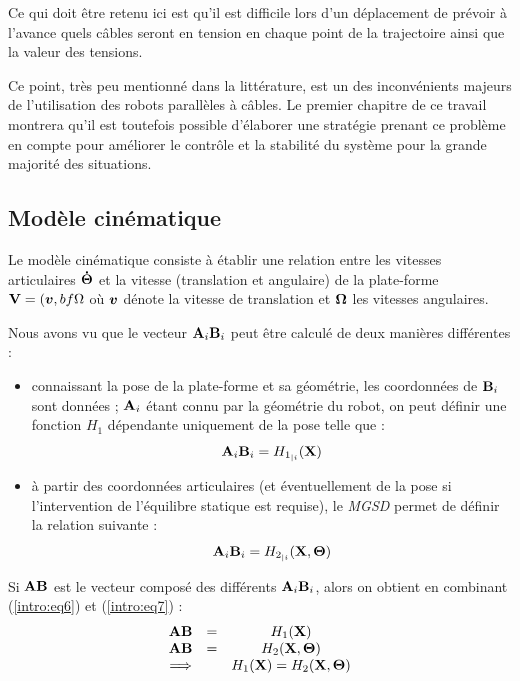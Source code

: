 Ce qui doit \^etre retenu ici est qu'il est difficile lors d'un déplacement de 
prévoir à l'avance quels câbles seront en tension en chaque point de la 
trajectoire ainsi que la valeur des tensions.

Ce point, très peu mentionné dans la littérature, est un des inconvénients 
majeurs de l'utilisation des robots parallèles à câbles. Le premier chapitre de 
ce travail montrera qu'il est toutefois possible d'élaborer une stratégie 
prenant ce problème en compte pour améliorer le contrôle et la stabilité du 
système pour la grande majorité des situations.

\subsection{Modèle cinématique}\label{chap0-2-5}

Le modèle cinématique consiste à établir une relation entre les 
vitesses articulaires ${\bf \dot \Theta}$ et la vitesse (translation et 
angulaire) de la plate-forme ${\bf V} = (\hbox{\boldmath $v$}, {bf \Omega}$ o\`u $\hbox{\boldmath $v$}$ d\'enote 
la vitesse de translation et $\bf \Omega$ les vitesses angulaires.

Nous avons vu que le vecteur ${\bf A}_i{\bf B}_i$ peut être calculé de deux 
manières différentes :
\begin{itemize}
 \item connaissant la pose de la plate-forme et sa géométrie, les coordonnées 
de 
${\bf B}_i$ sont données ; ${\bf A}_i$ étant connu par la géométrie du robot, 
on 
peut définir une fonction $H_1$ dépendante uniquement de la pose telle que :
\begin{equation}
{\bf A}_i{\bf B}_i = H_{1_{|i}}({\bf X})
\label{intro:eq6}
\end{equation}
 \item à partir des coordonnées articulaires (et éventuellement de la pose si 
l'intervention de l'équilibre statique est requise), le {\it MGSD} permet de 
définir la relation suivante :
\begin{equation}
{\bf A}_i{\bf B}_i = H_{2_{|i}}({\bf X}, {\bf \Theta})
\label{intro:eq7}
\end{equation}
\end{itemize}
 
Si ${\bf AB}$ est le vecteur composé des différents ${\bf A}_i{\bf B}_i$, alors 
on obtient en combinant (\ref{intro:eq6}) et (\ref{intro:eq7}) :
\begin{equation}
\begin{matrix}
{\bf AB} &=& H_1({\bf X}) \\
{\bf AB} &=& H_2({\bf X}, {\bf \Theta}) \\
\Longrightarrow & & H_1({\bf X}) = H_2({\bf X}, {\bf \Theta})
\end{matrix}
\label{intro:eq8}
\end{equation}

